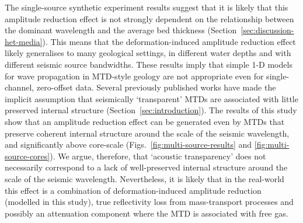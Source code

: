 \documentclass[se,manuscript]{copernicus}
\begin{document}
The single-source synthetic experiment results suggest that it is likely that this amplitude reduction effect is not strongly dependent on the relationship between the dominant wavelength and the average bed thickness (Section~\ref{sec:discussion-het-media}).
This means that the deformation-induced amplitude reduction effect likely generalises to many geological settings, in different water depths and with different seismic source bandwidths.
These results imply that simple 1-D models for wave propagation in MTD-style geology are not appropriate even for single-channel, zero-offset data.
Several previously published works have made the implicit assumption that seismically `transparent' MTDs are associated with little preserved internal structure (Section~\ref{sec:introduction}).
The results of this study show that an amplitude reduction effect can be generated even by MTDs that preserve coherent internal structure around the scale of the seismic wavelength, and significantly above core-scale (Figs.~\ref{fig:multi-source-results} and \ref{fig:multi-source-cores}).
We argue, therefore, that `acoustic transparency' does not necessarily correspond to a lack of well-preserved internal structure around the scale of the seismic wavelength.
Nevertheless, it is likely that in the real-world this effect is a combination of deformation-induced amplitude reduction (modelled in this study), true reflectivity loss from mass-transport processes and possibly an attenuation component where the MTD is associated with free gas.
\end{document}
